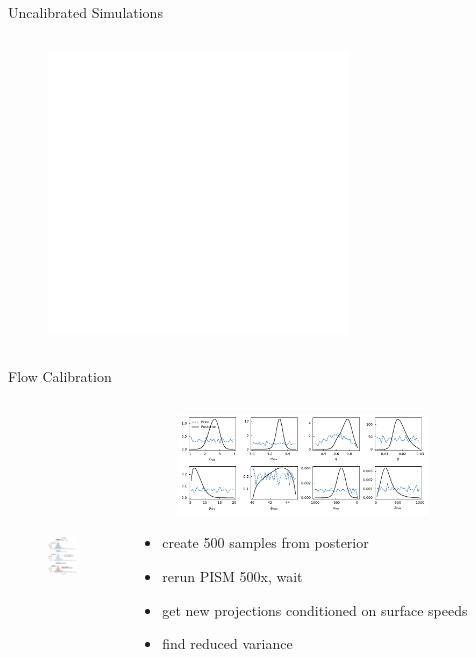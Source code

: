 \documentclass[aspectratio=169,hide notes,intlimits]{beamer}
\begin{document}
\begin{frame}{Uncalibrated Simulations}
\begin{columns}[c]
    \begin{column}{.5\textwidth}
      \begin{figure}
        \includegraphics<1>[height=7.5cm]{sle_pdf_w_obs_as19_2020.pdf}
    \end{figure}
    \end{column}
    \begin{column}{.5\textwidth}
    \end{column}
  \end{columns}

\end{frame}


\begin{frame}{Flow Calibration}
\begin{columns}[c]
    \begin{column}{.5\textwidth}
      \begin{figure}
        \includegraphics[height=7.5cm]{sle_pdf_w_obs_as19flow_2020.pdf}
    \end{figure}
    \end{column}
    \begin{column}{.5\textwidth}
      \begin{figure}
    \includegraphics[width=0.85\textwidth]{prior_posterior}
  \end{figure}

  \begin{itemize}
  \item<1> create 500 samples from posterior
  \item<1> rerun PISM 500x, wait
  \item<2> get new projections conditioned on surface speeds
  \item<2> find reduced variance
  \end{itemize}
    \end{column}
  \end{columns}

\end{frame}
\end{document}
